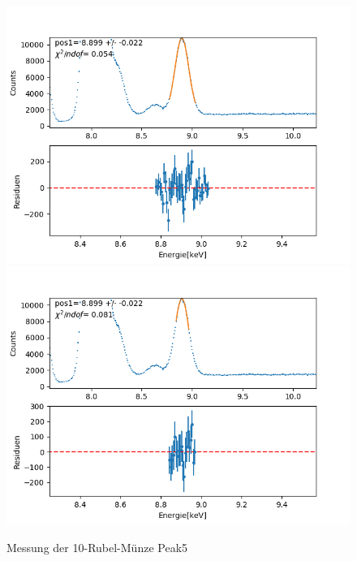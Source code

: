 \documentclass[12pt,a4paper]{article}
\begin{document}
\begin{figure}[H]
\centering
\includegraphics[scale=0.49]{Bilder/roentgen_spektren/rubel/rub6_1.png}
\includegraphics[scale=0.49]{Bilder/roentgen_spektren/rubel/rub6_2.png}
\caption{Messung der 10-Rubel-Münze Peak5}
\end{figure}
\end{document}

